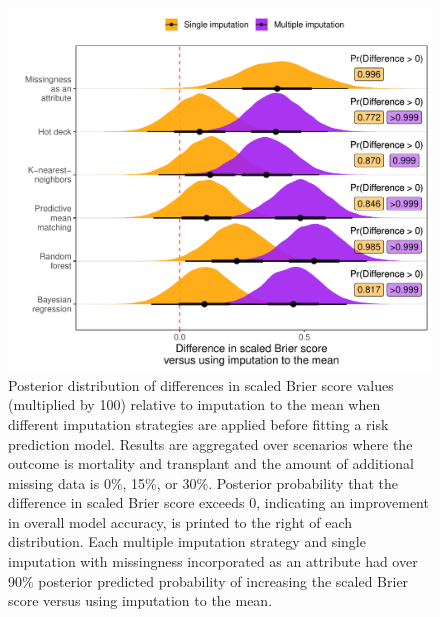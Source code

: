 \documentclass{article}
\begin{document}
\clearpage

\begin{figure}

{\centering \includegraphics{doc_arxiv_files/figure-latex/fig_md_strat_infer_ipa-1} 

}

\caption{Posterior distribution of differences in scaled Brier score values (multiplied by 100) relative to imputation to the mean when different imputation strategies are applied before fitting a risk prediction model. Results are aggregated over scenarios where the outcome is mortality and transplant and the amount of additional missing data is 0\%, 15\%, or 30\%. Posterior probability that the difference in scaled Brier score exceeds 0, indicating an improvement in overall model accuracy, is printed to the right of each distribution. Each multiple imputation strategy and single imputation with missingness incorporated as an attribute had over 90\% posterior predicted probability of increasing the scaled Brier score versus using imputation to the mean.}\label{fig:fig_md_strat_infer_ipa}
\end{figure}

\clearpage
\end{document}
